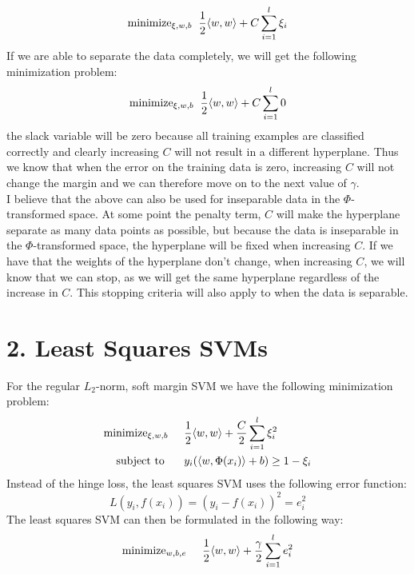 \documentclass{article}
\begin{document}
\begin{equation}
\label{eq:minthis}
\text{minimize}_{\xi,w,b} \hspace{0.2cm} \dfrac{1}{2} \langle w,w \rangle + C \sum\limits_{i=1}^l \xi_i \\
\end{equation}
If we are able to separate the data completely, we will get the following minimization problem:
\begin{equation}
\text{minimize}_{\xi,w,b} \hspace{0.2cm} \dfrac{1}{2} \langle w,w \rangle + C \sum\limits_{i=1}^l 0 \\
\end{equation}
the slack variable will be zero because all training examples are classified correctly and clearly increasing $C$ will not result in a different hyperplane. Thus we know that when the error on the training data is zero, increasing $C$ will not change the margin and we can therefore move on to the next value of $\gamma$. \\
I believe that the above can also be used for inseparable data in the $\Phi$-transformed space. At some point the penalty term, $C$ will make the hyperplane separate as many data points as possible, but because the data is inseparable in the $\Phi$-transformed space, the hyperplane will be fixed when increasing $C$. If we have that the weights of the hyperplane don't change, when increasing $C$, we will know that we can stop, as we will get the same hyperplane regardless of the increase in $C$. This stopping criteria will also apply to when the data is separable.
\section{2. Least Squares SVMs}
For the regular $L_2$-norm, soft margin SVM we have the following minimization problem:
\begin{align}
\text{minimize}_{\xi,w,b} \hspace{0.5cm} &\dfrac{1}{2} \langle w,w\rangle + \dfrac{C}{2} \sum\limits_{i=1}^l \xi_i^2 \\
\text{subject to } \hspace{0.5cm} &y_i(\langle w, \Phi(x_i) \rangle + b ) \geq 1 - \xi_i
\end{align}
Instead of the hinge loss, the least squares SVM uses the following error function:
\begin{equation}
L(y_i,f(x_i)) = (y_i - f(x_i))^2 = e_i^2
\end{equation}
The least squares SVM can then be formulated in the following way:
\begin{equation}
\label{eq:lsmin}
\text{minimize}_{w,b,e} \hspace{0.5cm} \dfrac{1}{2} \langle w,w \rangle + \dfrac{\gamma}{2} \sum\limits_{i=1}^l e_i^2
\end{equation}
\end{document}
